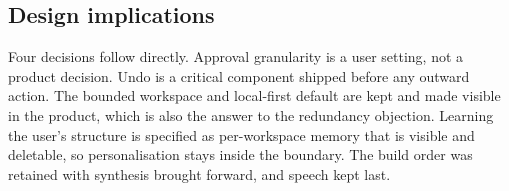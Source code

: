 \subsection{Design implications}
Four decisions follow directly. Approval granularity is a user setting, not a product decision. Undo is a critical component shipped before any outward action. The bounded workspace and local-first default are kept and made visible in the product, which is also the answer to the redundancy objection. Learning the user's structure is specified as per-workspace memory that is visible and deletable, so personalisation stays inside the boundary. The build order was retained with synthesis brought forward, and speech kept last.
